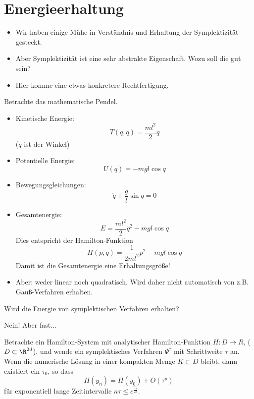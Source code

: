 \section{Energieerhaltung}

\begin{itemize}
\item Wir haben einige Mühe in Verständnis und Erhaltung der Symplektizität gesteckt.
\item Aber Symplektizität ist eine sehr abstrakte Eigenschaft.
  Wozu soll die gut sein?
\item Hier komme eine etwas konkretere Rechtfertigung.
\end{itemize}

Betrachte das mathematische Pendel.
\begin{itemize}
\item Kinetische Energie:
  \begin{equation*}
    T(q, \dot q) = \frac{m l^2}{2} \dot q
  \end{equation*}
  ($q$ ist der Winkel)
\item Potentielle Energie:
  \begin{equation*}
    U(q) = -mgl \cos q
  \end{equation*}
\item Bewegungsgleichungen:
  \begin{equation*}
    \ddot q + \frac gl \sin q = 0
  \end{equation*}
\item Gesamtenergie:
  \begin{equation*}
    E = \frac{m l^2}2 \dot q^2 - mgl \cos q
  \end{equation*}
  Dies entspricht der Hamilton-Funktion
  \begin{equation*}
    H(p, q) = \frac{1}{2ml^2} p^2 - mgl \cos q
  \end{equation*}
  Damit ist die Gesamtenergie eine Erhaltungsgröße!
\item Aber: weder linear noch quadratisch.
  Wird daher nicht automatisch von z.B. Gauß-Verfahren erhalten.
\end{itemize}

Wird die Energie von symplektischen Verfahren erhalten?

Nein! Aber fast...

\begin{satz}
  Betrachte ein Hamilton-System mit analytischer Hamilton-Funktion $H: D \to R$, ($D \subset \R^{2d}$),
  und wende ein symplektisches Verfahren $\Psi^\tau$ mit Schrittweite $\tau$ an.
  Wenn die numerische Lösung in einer kompakten Menge $K\subset D$ bleibt, dann existiert ein $\tau_0$, so dass
  \begin{equation*}
    H(y_n) = H(y_0) + O(\tau^p)
  \end{equation*}
  für exponentiell lange Zeitintervalle $n\tau \le e^{\frac{\tau_0}{2 \tau}}$.
\end{satz}

